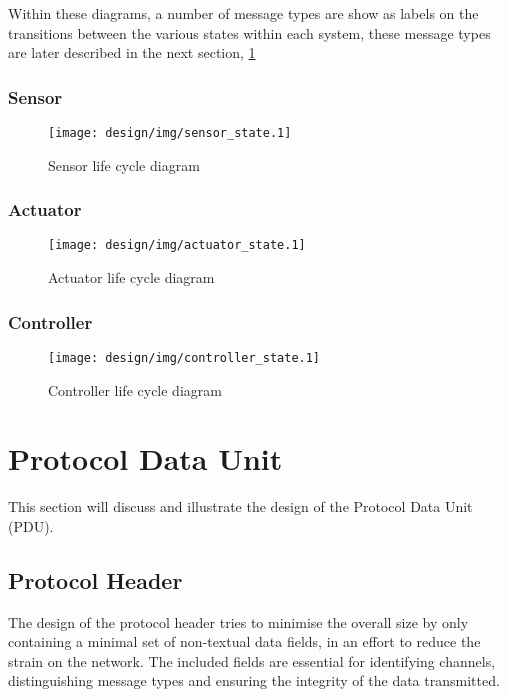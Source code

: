 Within these diagrams, a number of message types are show as labels on the transitions between the various states within each system, these message types are later described in the next section, \ref{sec:protocol_data_unit}

\subsubsection{Sensor} %
\label{ssub:sensor}
\begin{figure}[h!]
\centering
\texttt{[image: design/img/sensor\_state.1]}
\caption{Sensor life cycle diagram}
\label{fig:sensorstate}
\end{figure}


\subsubsection{Actuator} %
\label{ssub:actuator}
\begin{figure}[h!]
\centering
\texttt{[image: design/img/actuator\_state.1]}
\caption{Actuator life cycle diagram}
\label{fig:actuatorstate}
\end{figure}

\subsubsection{Controller} %
\label{ssub:controller}
\begin{figure}[h!]
\centering
\texttt{[image: design/img/controller\_state.1]}
\caption{Controller life cycle diagram}
\label{fig:controllerstate}
\end{figure}







\newpage
\section{Protocol Data Unit} %
\label{sec:protocol_data_unit}
This section will discuss and illustrate the design of the Protocol Data Unit (PDU).


\subsection{Protocol Header} %
\label{sub:protocol_header}
The design of the protocol header tries to minimise the overall size by only containing a minimal set of non-textual data fields, in an effort to reduce the strain on the network. The included fields are essential for identifying channels, distinguishing message types and ensuring the integrity of the data transmitted.

